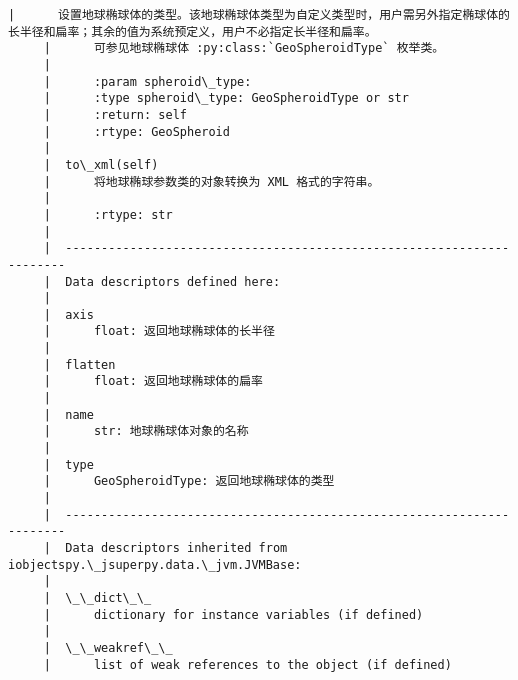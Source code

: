 \documentclass[11pt]{article}
\begin{document}
\begin{Verbatim}[commandchars=\\\{\}]
     |      设置地球椭球体的类型。该地球椭球体类型为自定义类型时，用户需另外指定椭球体的长半径和扁率；其余的值为系统预定义，用户不必指定长半径和扁率。
     |      可参见地球椭球体 :py:class:`GeoSpheroidType` 枚举类。
     |      
     |      :param spheroid\_type:
     |      :type spheroid\_type: GeoSpheroidType or str
     |      :return: self
     |      :rtype: GeoSpheroid
     |  
     |  to\_xml(self)
     |      将地球椭球参数类的对象转换为 XML 格式的字符串。
     |      
     |      :rtype: str
     |  
     |  ----------------------------------------------------------------------
     |  Data descriptors defined here:
     |  
     |  axis
     |      float: 返回地球椭球体的长半径
     |  
     |  flatten
     |      float: 返回地球椭球体的扁率
     |  
     |  name
     |      str: 地球椭球体对象的名称
     |  
     |  type
     |      GeoSpheroidType: 返回地球椭球体的类型
     |  
     |  ----------------------------------------------------------------------
     |  Data descriptors inherited from iobjectspy.\_jsuperpy.data.\_jvm.JVMBase:
     |  
     |  \_\_dict\_\_
     |      dictionary for instance variables (if defined)
     |  
     |  \_\_weakref\_\_
     |      list of weak references to the object (if defined)
    

\end{Verbatim}
\end{document}
